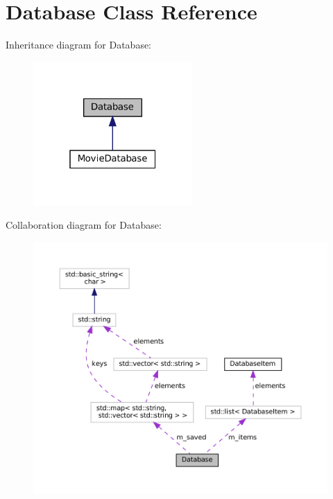 \hypertarget{classDatabase}{}\section{Database Class Reference}
\label{classDatabase}


Inheritance diagram for Database\+:
\nopagebreak
\begin{figure}[H]
\begin{center}
\leavevmode
\includegraphics[width=172pt]{classDatabase__inherit__graph}
\end{center}
\end{figure}


Collaboration diagram for Database\+:
\nopagebreak
\begin{figure}[H]
\begin{center}
\leavevmode
\includegraphics[width=350pt]{classDatabase__coll__graph}
\end{center}
\end{figure}
